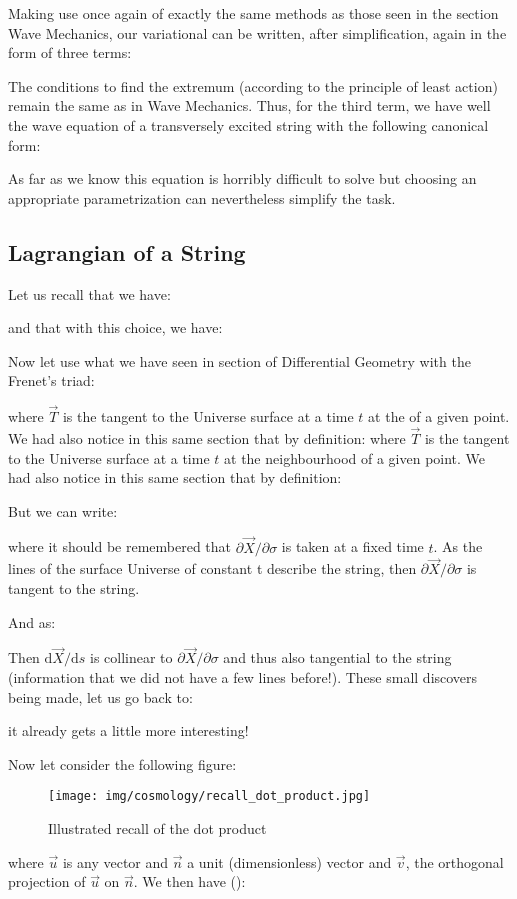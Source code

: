 	Making use once again of exactly the same methods as those seen in the section Wave Mechanics, our variational can be written, after simplification, again in the form of three terms:
	
	The conditions to find the extremum (according to the principle of least action) remain the same as in Wave Mechanics. Thus, for the third term, we have well the wave equation of a transversely excited string with the following canonical form:
	
	As far as we know this equation is horribly difficult to solve but choosing an appropriate parametrization can nevertheless simplify the task.
	
	\subsection{Lagrangian of a String}
	Let us recall that we have:
	
	and that with this choice, we have:
	
	Now let use what we have seen in section of Differential Geometry with the Frenet's triad:
	
	where $\vec{T}$ is the tangent to the Universe surface at a time $t$ at the  of a given point. We had also notice in this same section that by definition: where $\vec{T}$ is the tangent to the Universe surface at a time $t$ at the neighbourhood of a given point. We had also notice in this same section that by definition:
	
	But we can write:
	
	where it should be remembered that $\partial \vec{X}/\partial \sigma$ is taken at a fixed time $t$. As the lines of the surface Universe of constant $ $t describe the string, then $\partial \vec{X}/\partial \sigma$ is tangent to the string.

	And as:
	
	Then $\mathrm{d}\vec{X}/\mathrm{d}s$ is collinear to $\partial \vec{X}/\partial \sigma$ and thus also tangential to the string (information that we did not have a few lines before!). These small discovers being made, let us go back to:
	
	it already gets a little more interesting!

	Now let consider the following figure:
	\begin{figure}[H]
		\centering
		\texttt{[image: img/cosmology/recall\_dot\_product.jpg]}	
		\caption[]{Illustrated recall of the dot product}
	\end{figure}
	where $\vec{u}$ is any vector and $\vec{n}$ a unit (dimensionless) vector and $\vec{v}$, the orthogonal projection of $\vec{u}$ on $\vec{n}$. We then have ():
	
